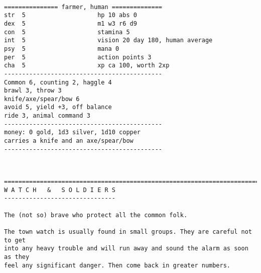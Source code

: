 \

\goodbreak \begin{samepage} \small \begin{verbatim}
=============== farmer, human ==============
str  5                    hp 10 abs 0
dex  5                    m1 w3 r6 d9
con  5                    stamina 5
int  5                    vision 20 day 180, human average
psy  5                    mana 0
per  5                    action points 3
cha  5                    xp ca 100, worth 2xp
--------------------------------------------
Common 6, counting 2, haggle 4
brawl 3, throw 3
knife/axe/spear/bow 6
avoid 5, yield +3, off balance
ride 3, animal command 3
--------------------------------------------
money: 0 gold, 1d3 silver, 1d10 copper
carries a knife and an axe/spear/bow
--------------------------------------------
\end{verbatim} \normalsize \end{samepage}

\








\goodbreak
{}


\goodbreak \begin{samepage} \small \begin{verbatim}
================================================================================
W A T C H   &   S O L D I E R S
-------------------------------

The (not so) brave who protect all the common folk.

The town watch is usually found in small groups. They are careful not to get
into any heavy trouble and will run away and sound the alarm as soon as they
feel any significant danger. Then come back in greater numbers.
\end{verbatim} \normalsize \end{samepage}

\


